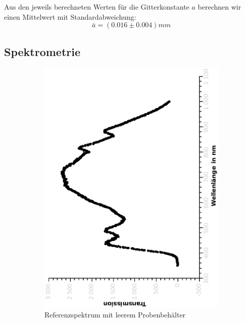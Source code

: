 \documentclass{article}
\begin{document}
\vspace{0.3mm}
Aus den jeweils berechneten Werten für die Gitterkonstante $a$ berechnen wir einen Mittelwert mit Standardabweichung:
$$\boxed{\bar{a}=(0.016 \pm 0.004)mm}$$

\subsection{Spektrometrie}

\begin{figure}[H]
\centering
\begin{subfigure}[h]{0.4\textwidth}
\includegraphics[width=\textwidth ,angle=-90]{eps/referenztrans1.eps}
\caption{Referenzspektrum mit leerem Probenbehälter}
\end{subfigure}
\begin{subfigure}[h]{0.4\textwidth}

\end{subfigure}
\end{figure}
\end{document}
